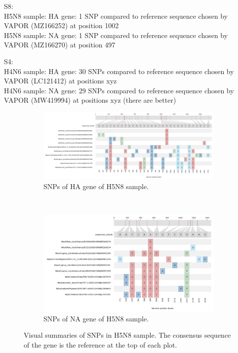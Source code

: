 S8: \\
H5N8 sample: HA gene: 1 SNP compared to reference sequence chosen by VAPOR (MZ166252) at position 1002 \\
H5N8 sample: NA gene: 1 SNP compared to reference sequence chosen by VAPOR (MZ166270) at position 497

S4: \\
H4N6 sample: HA gene: 30 SNPs compared to reference sequence chosen by VAPOR (LC121412) at positions xyz \\
H4N6 sample: NA gene: 29 SNPs compared to reference sequence chosen by VAPOR (MW419994) at positions xyz (there are better)



\begin{figure}
\centering
    \begin{subfigure}[b]{1.1\textwidth}
        \includegraphics[width=1.0\linewidth]{media/4-aiv-snipit-s8-4-ha.png}
        \caption{SNPs of HA gene of H5N8 sample.}
    \label{fig:4-aiv-snipit-s8-ha}
    \end{subfigure}
    \\
    \begin{subfigure}[b]{1.1\textwidth}
        \centering
        \includegraphics[width=1.0\linewidth]{media/4-aiv-snipit-s8-6-na.png}
    \caption{SNPs of NA gene of H5N8 sample.}
    \label{fig:4-aiv-snipit-s8-na}
    \end{subfigure}
    \caption[Visual summaries of SNPs in H5N8 sample.]{Visual summaries of SNPs in H5N8 sample. The consensus sequence of the gene is the reference at the top of each plot.}
\label{fig:4-aiv-snipit-s8}
\end{figure}

